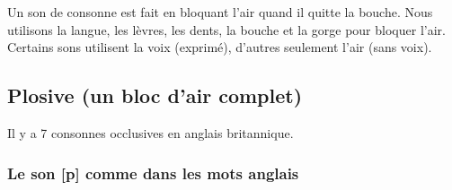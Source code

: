 \chapter{}
\label{sec:org7af88d6}
Un son de consonne est fait en bloquant l'air quand il quitte la bouche. Nous utilisons la langue, les lèvres, les dents, la bouche et la gorge pour bloquer l'air. Certains sons utilisent la voix (exprimé), d'autres seulement l'air (sans voix).
\section{Plosive (un bloc d'air complet)}
\label{sec:orga048006}
Il y a 7 consonnes occlusives en anglais britannique.  
\subsection{Le son [p] comme dans les mots anglais}
\label{sec:orge071836}
